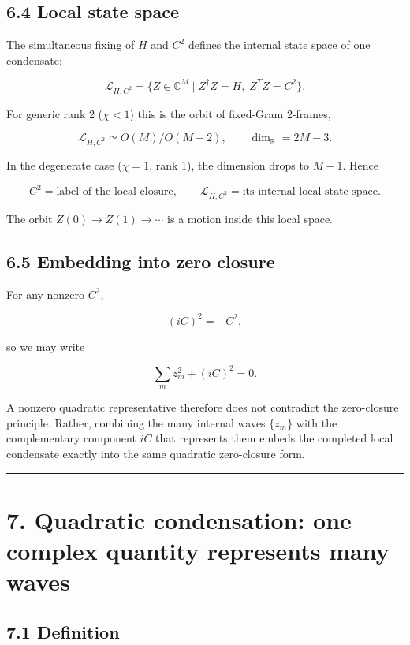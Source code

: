 \documentclass[
  a4paper,
]{article}
\begin{document}
\subsection{6.4 Local state space}\label{local-state-space}

The simultaneous fixing of \(H\) and \(C^2\) defines the internal state
space of one condensate:

\[
\boxed{
\mathcal L_{H,C^2}
=
\{Z\in\mathbb C^M \mid
Z^\dagger Z=H,\;
Z^TZ=C^2\}
}.
\]

For generic rank 2 (\(\chi<1\)) this is the orbit of fixed-Gram
2-frames,

\[
\boxed{
\mathcal L_{H,C^2}
\simeq
O(M)/O(M-2)
},
\qquad
\dim_{\mathbb R}=2M-3.
\]

In the degenerate case (\(\chi=1\), rank 1), the dimension drops to
\(M-1\). Hence

\[
\boxed{
C^2=\text{label of the local closure},
\qquad
\mathcal L_{H,C^2}=\text{its internal local state space}
}.
\]

The orbit \(Z(0)\to Z(1)\to\cdots\) is a motion inside this local space.

\subsection{6.5 Embedding into zero
closure}\label{embedding-into-zero-closure}

For any nonzero \(C^2\),

\[
(iC)^2=-C^2,
\]

so we may write

\[
\boxed{
\sum_m z_m^2+(iC)^2=0
}.
\]

A nonzero quadratic representative therefore does not contradict the
zero-closure principle. Rather, combining the many internal waves
\(\{z_m\}\) with the complementary component \(iC\) that represents them
embeds the completed local condensate exactly into the same quadratic
zero-closure form.

\begin{center}\rule{0.5\linewidth}{0.5pt}\end{center}

\section{7. Quadratic condensation: one complex quantity represents many
waves}\label{quadratic-condensation-one-complex-quantity-represents-many-waves}

\subsection{7.1 Definition}\label{definition}
\end{document}
